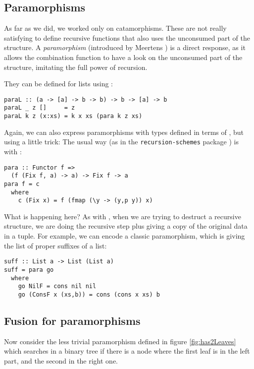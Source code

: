 \subsection{Paramorphisms}
\label{sec:para-list}

As far as we did, we worked only on catamorphisms. These are not really satisfying to define recursive functions that also uses the unconsumed part of the structure. A \emph{paramorphism} (introduced by Meertens \cite{Meertens1992}) is a direct response, as it allows the combination function to have a look on the unconsumed part of the structure, imitating the full power of recursion.

They can be defined for lists using :
\begin{verbatim}
paraL :: (a -> [a] -> b -> b) -> b -> [a] -> b
paraL _ z []     = z
paraL k z (x:xs) = k x xs (para k z xs)
\end{verbatim}

Again, we can also express paramorphisms with types defined in terms of , but using a little trick: The usual way (as in the \verb|recursion-schemes| package \cite{ekmett:eschems}) is with :
\begin{verbatim}
para :: Functor f =>
  (f (Fix f, a) -> a) -> Fix f -> a
para f = c
  where
    c (Fix x) = f (fmap (\y -> (y,p y)) x)
\end{verbatim}

\noindent What is happening here? As with , when we are trying to destruct a recursive structure, we are doing the recursive step plus giving a copy of the original data in a tuple.
For example, we can encode a classic paramorphism, which is giving the list of proper suffixes of a list:
\begin{verbatim}
suff :: List a -> List (List a)
suff = para go
  where
    go NilF = cons nil nil
    go (ConsF x (xs,b)) = cons (cons x xs) b
\end{verbatim}

\subsection{Fusion for paramorphisms}

Now consider the less trivial paramorphism  defined in figure \ref{fig:has2Leaves} which searches in a binary tree if there is a node where the first leaf is in the left part, and the second in the right one.

